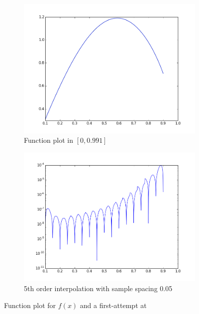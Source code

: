 \documentclass[11pt]{article}
\begin{document}
\begin{figure}[h]
        \centering
        \begin{subfigure}{.5\textwidth}
  \centering
        \includegraphics[width=\linewidth]{q7/interpol.png}
                \caption{Function plot in $[0,0.991]$}
                \label{fig:q7_interpol}
                \end{subfigure}%
\begin{subfigure}{.5\textwidth}
  \centering
        \includegraphics[width=\linewidth]{q7/err_6.png}
                \caption{5th order interpolation with sample spacing 0.05}
                \label{fig:q7_err6}
	\end{subfigure}
	\caption{Function plot for $f(x)$ and a first-attempt at }
\end{figure}           
        
\end{document}
